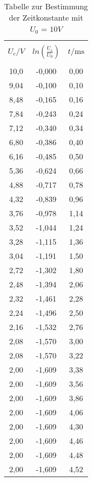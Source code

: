 \begin{table}[H]
  \centering
  \caption{Tabelle zur Bestimmung der Zeitkonstante mit $U_\text{0}$ = $10V$}
    \begin{tabular}{c c c}
      \toprule \\
      $U_\text{c} / V$& $ln(\frac{U_\text{c}}{U_\text{0}})$ & $t /\si{\milli\second}$ \\
      \midrule \\
      10,0& -0,000 & 0,00 \\
      9,04& -0,100 & 0,10 \\
      8,48& -0,165 & 0,16 \\
      7,84& -0,243 & 0,24 \\
      7,12& -0,340 & 0,34 \\
      6,80& -0,386 & 0,40 \\
      6,16& -0,485 & 0,50 \\
      5,36& -0,624 & 0,66 \\
      4,88& -0,717 & 0,78 \\
      4,32& -0,839 & 0,96 \\
      3,76& -0,978 & 1,14 \\
      3,52& -1,044 & 1,24 \\
      3,28& -1,115 & 1,36 \\
      3,04& -1,191 & 1,50 \\
      2,72& -1,302 & 1,80 \\
      2,48& -1,394 & 2,06 \\
      2,32& -1,461 & 2,28 \\
      2,24& -1,496 & 2,50 \\
      2,16& -1,532 & 2,76 \\
      2,08& -1,570 & 3,00 \\
      2,08& -1,570 & 3,22 \\
      2,00& -1,609 & 3,38 \\
      2,00& -1,609 & 3,56 \\
      2,00& -1,609 & 3,86 \\
      2,00& -1,609 & 4,06 \\
      2,00& -1,609 & 4,30 \\
      2,00& -1,609 & 4,46 \\
      2,00& -1,609 & 4,48 \\
      2,00& -1,609 & 4,52 \\
      \bottomrule
    \end{tabular}
    \label{tab:1}
  \end{table}

